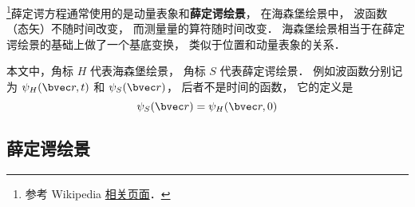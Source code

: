 



\footnote{参考 Wikipedia \href{https://en.wikipedia.org/wiki/Heisenberg_picture}{相关页面}．}薛定谔方程通常使用的是动量表象和\textbf{薛定谔绘景}， 在海森堡绘景中， 波函数（态矢）不随时间改变， 而测量量的算符随时间改变． 海森堡绘景相当于在薛定谔绘景的基础上做了一个基底变换， 类似于位置和动量表象的关系．

本文中，角标 $H$ 代表海森堡绘景， 角标 $S$ 代表薛定谔绘景． 例如波函数分别记为 $\psi_H(\bvec r, t)$ 和 $\psi_S(\bvec r)$， 后者不是时间的函数， 它的定义是
\begin{equation}
\psi_S(\bvec r) = \psi_H(\bvec r, 0)
\end{equation}




\subsection{薛定谔绘景}

